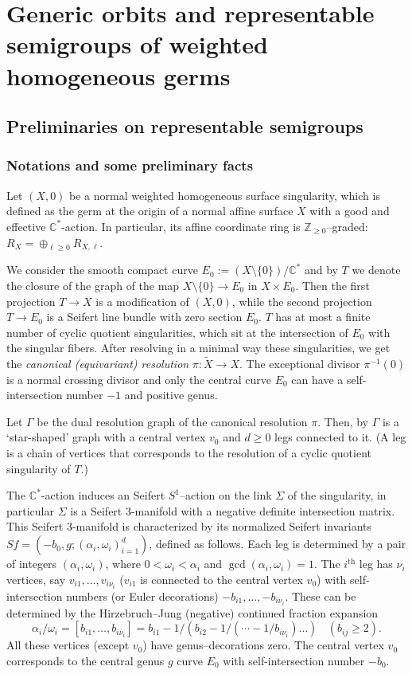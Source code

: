 \documentclass[12pt,a4paper]{amsart}
\theoremstyle{remark}
\theoremstyle{definition}
\begin{document}
\section{Generic orbits and representable semigroups of weighted homogeneous germs}\label{s:genorb}
\subsection{Preliminaries on representable semigroups}
\subsubsection{\bf Notations and some preliminary  facts}\label{sss:facts}
Let $(X,0)$ be a normal weighted homogeneous surface singularity, which is defined as the germ at the origin of a normal affine surface $X$ with a good and effective  $\mathbb{C}^*$-action. In particular,  its affine coordinate ring is $\mathbb{Z}_{\geq 0}$--graded: $R_X=\oplus_{\ell\geq 0} R_{X,\ell}$. 

We consider the smooth compact curve $E_0:=(X\setminus\{0\})/\mathbb{C}^*$ and by $T$ we denote the closure of the graph of the map $X\setminus \{0\}\to E_0$ in $X\times E_0$. Then the first projection $T\to X$ is a modification of $(X,0)$, while the second projection $T\to E_0$ is a Seifert line bundle with zero section $E_0$. $T$ has at most a finite number of cyclic quotient singularities, which sit  at the intersection of $E_0$ with the singular fibers. After resolving in a minimal way these singularities, we get the {\em canonical (equivariant)  resolution} $\pi:\widetilde X\to X$.
The exceptional divisor $\pi^{-1}(0)$ is a normal crossing divisor and only the central curve $E_0$ can have a self-intersection number $-1$ and positive genus.

Let $\Gamma$ be the dual resolution graph of the canonical resolution $\pi$. Then, by
\cite{OW} $\Gamma$ is a `star-shaped' graph with a central vertex $v_0$ and $d\ge 0$ legs connected to it. (A leg is  a chain of vertices that corresponds to the resolution of a cyclic quotient singularity of $T$.)

The $\mathbb{C}^*$-action induces an Seifert $S^1$--action on the link $\Sigma$ of the singularity, in particular 
$\Sigma$ is a  Seifert 3-manifold with a negative definite intersection matrix. This Seifert 3-manifold 
is characterized by its normalized Seifert invariants  $Sf=(-b_0,g;(\alpha_i,\omega_i)_{i=1}^d)$, defined as follows. Each leg is determined by a pair of integers  $(\alpha_i,\omega_i)$,
where $0<\omega_i <\alpha_i$ and $\gcd(\alpha_i,\omega_i)=1$. The $i^{\mathrm{th}}$ leg has $\nu_i$ vertices, say $v_{i1},\ldots, v_{i\nu_i}$ ($v_{i1}$ is connected to the central vertex $v_0$)
with self-intersection numbers (or Euler decorations) 
$-b_{i1},\ldots, -b_{i\nu_i}$.  These can be determined by the Hirzebruch--Jung (negative) continued fraction expansion
$$ \alpha_i/\omega_i=[b_{i1},\ldots, b_{i\nu_i}]=
b_{i1}-1/(b_{i2}-1/(\cdots -1/b_{i\nu_i})\dots) \ \  \ \ (b_{ij}\geq 2).$$
All these vertices (except $v_0$) have genus--decorations zero. The central vertex $v_0$ corresponds to the central genus $g$ curve $E_0$ with self-intersection number $-b_0$.
\end{document}
